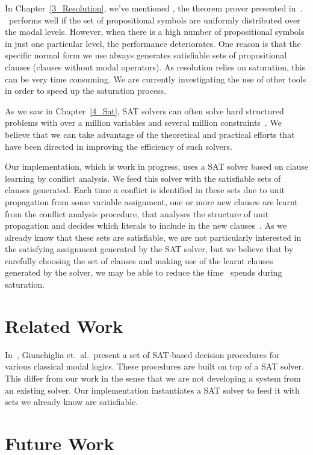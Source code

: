 In Chapter~\ref{3_Resolution}, we've mentioned \ksp, the theorem prover
presented in~\cite{Nalon2016}. \ksp~performs well if the set of propositional
symbols are uniformly distributed over the modal levels. However, when there is
a high number of propositional symbols in just one particular level, the
performance deteriorates. One reason is that the specific normal form we use
always generates satisfiable sets of propositional clauses (clauses
without modal operators). As resolution relies on saturation, this can be very
time consuming. We are currently investigating the use of other tools in order
to speed up the saturation process. 

As we saw in Chapter~\ref{4_Sat}, SAT solvers can often solve hard structured
problems with over a million variables and several million
constraints~\cite{satchapter}. We believe that we can take advantage of the
theoretical and practical efforts that have been directed in improving the
efficiency of such solvers. 

Our implementation, which is work in progress, uses a SAT solver based on clause
learning by conflict analysis. We feed this solver with the satisfiable sets of
clauses generated. Each time a conflict is identified in these sets due to unit
propagation from some variable assignment, one or more new clauses are learnt
from the conflict analysis procedure, that analyses the structure of unit
propagation and decides which literals to include in the new
clauses~\cite{cdclchapter}. As we already know that these sets are satisfiable,
we are not particularly interested in the satisfying assignment generated by the
SAT solver, but we believe that by carefully choosing the set of clauses and
making use of the learnt clauses generated by the solver, we may be able to
reduce the time \ksp~spends during saturation. 


\section{Related Work}
In~\cite{giunchiglia2002sat}, Giunchiglia et.\ al.\ present a set of SAT-based
decision procedures for various classical modal logics. These procedures are
built on top of a SAT solver. This differ from our work in the sense that we are
not developing a system from an existing solver. Our implementation instantiates
a SAT solver to feed it with sets we already know are satisfiable.

\section{Future Work}
